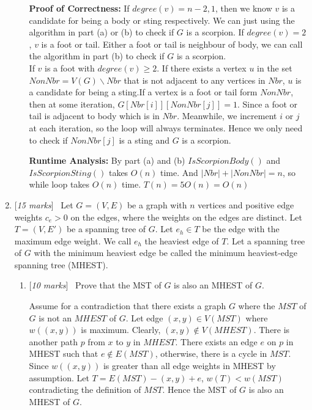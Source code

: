 \documentclass[11pt]{article}
\newcommand{\Q}[1]{\medskip\item {[{\em #1 marks\/}]}\ }
\begin{document}
\begin{enumerate}
\begin{enumerate}
\textbf{Proof of Correctness:} If $degree(v) = n - 2, 1$, then we know $v$ is a candidate for being a body or 
sting respectively. We can just using the algorithm in part (a) or (b) to check if $G$ is a scorpion. If 
$degree(v) = 2$, $v$ is a foot or tail. Either a foot or tail is neighbour of body, we can call the algorithm 
in part (b) to check if $G$ is a scorpion.\\
If $v$ is a foot with $degree(v) \geq 2$. If there exists a vertex $u$ in the set $NonNbr = V(G) \backslash Nbr$ 
that is not adjacent to any vertices in $Nbr$, $u$ is a candidate for being a sting.If a vertex is a foot or 
tail form $NonNbr$, then at some iteration, $G[Nbr[i]][NonNbr[j]] = 1$. Since a foot or tail is adjacent to 
body which is in $Nbr$. Meanwhile, we increment $i$ or $j$ at each iteration, so the loop will always 
terminates. Hence we only need to check if $NonNbr[j]$ is a sting and $G$ is a scorpion.

\textbf{Runtime Analysis:} By part (a) and (b) $IsScorpionBody()$ and $IsScorpionSting()$ takes $O(n)$ time. 
And $|Nbr| + |NonNbr| = n$, so while loop takes $O(n)$ time. $T(n) = 5 O(n) = O(n)$
\end{enumerate}



\newpage
\Q{15} Let $G=(V, E)$ be a graph with $n$ vertices and positive edge weights $c_e > 0$ on the edges, where the weights on the edges are distinct. 
Let $T=(V, E')$ be a spanning tree of $G$. Let $e_h \in T$ be the edge with the maximum edge weight. We call $e_h$ the heaviest edge of $T$. Let a spanning tree of $G$ with the minimum heaviest edge be called the minimum heaviest-edge spanning tree (MHEST). 

\begin{enumerate}
\Q{10} Prove that the MST of $G$ is also an MHEST of $G$.

Assume for a contradiction that there exists a graph $G$ where the $MST$ of $G$ is not an $MHEST$ of $G$. Let 
edge $(x, y) \in V(MST)$ where $w((x, y))$ is maximum. 
Clearly, $(x, y) \notin V(MHEST)$. There is another path $p$ from $x$ to $y$ in $MHEST$. There exists an edge 
$e$ on $p$ in MHEST such that $e \notin E(MST)$, otherwise, there is a cycle in $MST$. Since $w((x, y))$ is 
greater than all edge weights in MHEST by assumption. Let $T = E(MST) - (x, y) + e$, $w(T) < w(MST)$ 
contradicting the definition of $MST$. Hence the MST of $G$ is also an MHEST of $G$.


\end{enumerate}
\end{enumerate}
\end{document}

